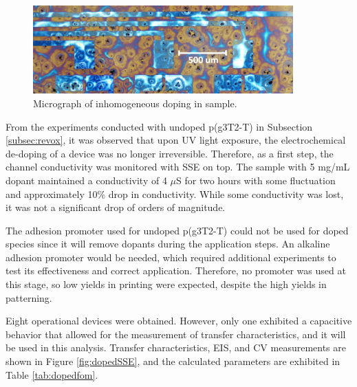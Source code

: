 \begin{figure}[ht]
    \centering
    \includegraphics[width=10cm]{Images/pdf/unhom_doping.pdf} 
    \caption[Inhomogeneous doping issues]{Micrograph of inhomogeneous doping in sample.}
    \label{fig:unhom}
\end{figure}

From the experiments conducted with undoped p(g3T2-T) in Subsection \ref{subsec:revox}, it was observed that upon UV light exposure, the electrochemical de-doping of a device was no longer irreversible. Therefore, as a first step, the channel conductivity was monitored with SSE on top. The sample with 5 mg/mL dopant maintained a conductivity of 4 $\mu$S for two hours with some fluctuation and approximately 10\% drop in conductivity. While some conductivity was lost, it was not a significant drop of orders of magnitude. 

The adhesion promoter used for undoped p(g3T2-T) could not be used for doped species since it will remove dopants during the application steps. An alkaline adhesion promoter would be needed, which required additional experiments to test its effectiveness and correct application. Therefore, no promoter was used at this stage, so low yields in printing were expected, despite the high yields in patterning.

Eight operational devices were obtained. However, only one exhibited a capacitive behavior that allowed for the measurement of transfer characteristics, and it will be used in this analysis. %
Transfer characteristics, EIS, and CV measurements are shown in Figure \ref{fig:dopedSSE}, and the calculated parameters are exhibited in Table \ref{tab:dopedfom}.

